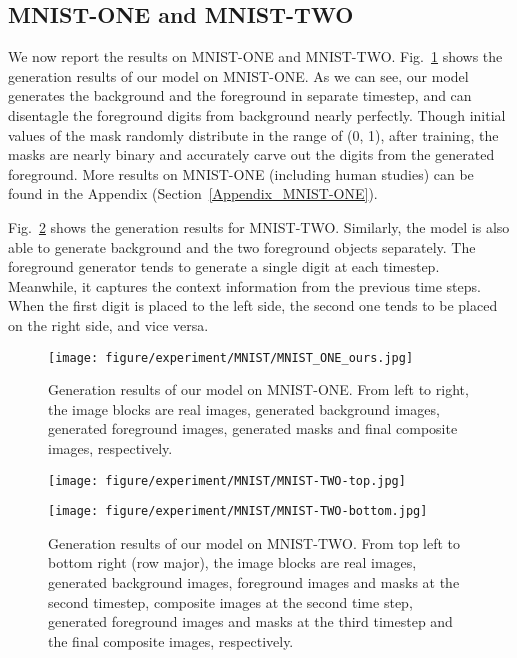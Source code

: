 \documentclass{article} \usepackage{iclr2017_conference,times}
\begin{document}
\subsection{MNIST-ONE and MNIST-TWO}
\vspace{-5pt}
We now report the results on MNIST-ONE and MNIST-TWO. Fig.~\ref{Fig_MNIST-ONE} shows the generation results of our model on MNIST-ONE. As we can see, our model generates the background and the foreground in separate timestep, and can disentagle the foreground digits from background nearly perfectly. Though initial values of the mask randomly distribute in the range of (0, 1), after training, the masks are nearly binary and accurately carve out the digits from the generated foreground. More results on MNIST-ONE (including human studies) can be found in the Appendix (Section~\ref{Appendix_MNIST-ONE}).

Fig.~\ref{Fig_MNISTDisentangle} shows the generation results for MNIST-TWO. Similarly, the model is also able to generate background and the two foreground objects separately. The foreground generator tends to generate a single digit at each timestep. Meanwhile, it captures the context information from the previous time steps. When the first digit is placed to the left side, the second one tends to be placed on the right side, and vice versa. 

\begin{figure}[h]
\center
\texttt{[image: figure/experiment/MNIST/MNIST\_ONE\_ours.jpg]}
\caption{Generation results of our model on MNIST-ONE. From left to right, the image blocks are real images, generated background images, generated foreground images, generated masks and final composite images, respectively.}
\label{Fig_MNIST-ONE}
\end{figure}

\begin{figure}[h]
\begin{minipage}{\linewidth}
\center
\texttt{[image: figure/experiment/MNIST/MNIST-TWO-top.jpg]}
\end{minipage}
\begin{minipage}{\linewidth}
\center
\texttt{[image: figure/experiment/MNIST/MNIST-TWO-bottom.jpg]}
\end{minipage}
\caption{Generation results of our model on MNIST-TWO. From top left to bottom right (row major), the image blocks are real images, generated background images, foreground images and masks at the second timestep, composite images at the second time step, generated foreground images and masks at the third timestep and the final composite images, respectively.}
\label{Fig_MNISTDisentangle}
\end{figure}
\end{document}
